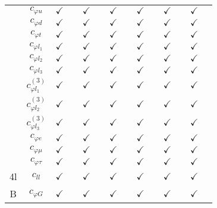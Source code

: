 \documentclass{article}
\begin{document}
\begin{table}[H]
\begin{tabular}{|c|c|c|c|c|c|c|c|c|c|c|c|c|c|}
 & $c_{\varphi u}$ & $\checkmark$ &  & $\checkmark$ &  & $\checkmark$ &  & $\checkmark$ &  & $\checkmark$ &  & $\checkmark$ & \\ \cline{2-14}
 & $c_{\varphi d}$ & $\checkmark$ &  & $\checkmark$ &  & $\checkmark$ &  & $\checkmark$ &  & $\checkmark$ &  & $\checkmark$ & \\ \cline{2-14}
 & $c_{\varphi t}$ & $\checkmark$ &  & $\checkmark$ &  & $\checkmark$ &  & $\checkmark$ &  & $\checkmark$ &  & $\checkmark$ & \\ \cline{2-14}
 & $c_{\varphi l_1}$ & $\checkmark$ &  & $\checkmark$ &  & $\checkmark$ &  & $\checkmark$ &  & $\checkmark$ &  & $\checkmark$ & \\ \cline{2-14}
 & $c_{\varphi l_2}$ & $\checkmark$ &  & $\checkmark$ &  & $\checkmark$ &  & $\checkmark$ &  & $\checkmark$ &  & $\checkmark$ & \\ \cline{2-14}
 & $c_{\varphi l_3}$ & $\checkmark$ &  & $\checkmark$ &  & $\checkmark$ &  & $\checkmark$ &  & $\checkmark$ &  & $\checkmark$ & \\ \cline{2-14}
 & $c_{\varphi l_1}^{(3)}$ & $\checkmark$ &  & $\checkmark$ &  & $\checkmark$ &  & $\checkmark$ &  & $\checkmark$ &  & $\checkmark$ & \\ \cline{2-14}
 & $c_{\varphi l_2}^{(3)}$ & $\checkmark$ &  & $\checkmark$ &  & $\checkmark$ &  & $\checkmark$ &  & $\checkmark$ &  & $\checkmark$ & \\ \cline{2-14}
 & $c_{\varphi l_3}^{(3)}$ & $\checkmark$ &  & $\checkmark$ &  & $\checkmark$ &  & $\checkmark$ &  & $\checkmark$ &  & $\checkmark$ & \\ \cline{2-14}
 & $c_{\varphi e}$ & $\checkmark$ &  & $\checkmark$ &  & $\checkmark$ &  & $\checkmark$ &  & $\checkmark$ &  & $\checkmark$ & \\ \cline{2-14}
 & $c_{\varphi \mu}$ & $\checkmark$ &  & $\checkmark$ &  & $\checkmark$ &  & $\checkmark$ &  & $\checkmark$ &  & $\checkmark$ & \\ \cline{2-14}
 & $c_{\varphi \tau}$ & $\checkmark$ &  & $\checkmark$ &  & $\checkmark$ &  & $\checkmark$ &  & $\checkmark$ &  & $\checkmark$ & 
\\ \hline
\multirow{1}{*}{4l}
 & $c_{ll}$ & $\checkmark$ &  & $\checkmark$ &  & $\checkmark$ &  & $\checkmark$ &  & $\checkmark$ &  & $\checkmark$ & 
\\ \hline
\multirow{7}{*}{B}
 & $c_{\varphi G}$ & $\checkmark$ &  & $\checkmark$ &  & $\checkmark$ &  & $\checkmark$ &  & $\checkmark$ &  & $\checkmark$ & \\ \cline{2-14}

\end{tabular}
\end{table}
\end{document}
